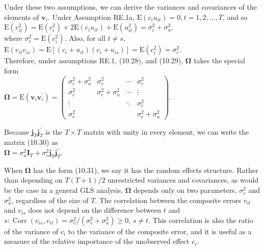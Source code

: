 \documentclass[10pt]{article}
\begin{document}
Under these two assumptions, we can derive the variances and covariances of the elements of $\mathbf{v}_{i}$. Under Assumption RE.1a, $\mathrm{E}\left(c_{i} u_{i t}\right)=0, t=1,2, \ldots, T$, and so\\
$\mathrm{E}\left(v_{i t}^{2}\right)=\mathrm{E}\left(c_{i}^{2}\right)+2 \mathrm{E}\left(c_{i} u_{i t}\right)+\mathrm{E}\left(u_{i t}^{2}\right)=\sigma_{c}^{2}+\sigma_{u}^{2}$,\\
where $\sigma_{c}^{2}=\mathrm{E}\left(c_{i}^{2}\right)$. Also, for all $t \neq s$,\\
$\mathrm{E}\left(v_{i t} v_{i s}\right)=\mathrm{E}\left[\left(c_{i}+u_{i t}\right)\left(c_{i}+u_{i s}\right)\right]=\mathrm{E}\left(c_{i}^{2}\right)=\sigma_{c}^{2}$.\\
Therefore, under assumptions RE.1, (10.28), and (10.29), $\boldsymbol{\Omega}$ takes the special form\\
$\boldsymbol{\Omega}=\mathrm{E}\left(\mathbf{v}_{i} \mathbf{v}_{i}^{\prime}\right)=\left(\begin{array}{cccc}\sigma_{c}^{2}+\sigma_{u}^{2} & \sigma_{c}^{2} & \cdots & \sigma_{c}^{2} \\ \sigma_{c}^{2} & \sigma_{c}^{2}+\sigma_{u}^{2} & \cdots & \vdots \\ \vdots & & \ddots & \sigma_{c}^{2} \\ \sigma_{c}^{2} & & & \sigma_{c}^{2}+\sigma_{u}^{2}\end{array}\right)$.

Because $\mathbf{j}_{T} \mathbf{j}_{T}^{\prime}$ is the $T \times T$ matrix with unity in every element, we can write the matrix (10.30) as\\
$\boldsymbol{\Omega}=\sigma_{u}^{2} \mathbf{I}_{T}+\sigma_{c}^{2} \mathbf{j}_{T} \mathbf{j}_{T}^{\prime}$.

When $\boldsymbol{\Omega}$ has the form (10.31), we say it has the random effects structure. Rather than depending on $T(T+1) / 2$ unrestricted variances and covariances, as would be the case in a general GLS analysis, $\boldsymbol{\Omega}$ depends only on two parameters, $\sigma_{c}^{2}$ and $\sigma_{u}^{2}$, regardless of the size of $T$. The correlation between the composite errors $v_{i t}$ and $v_{i s}$ does not depend on the difference between $t$ and $s: \operatorname{Corr}\left(v_{i s}, v_{i t}\right)=\sigma_{c}^{2} /\left(\sigma_{c}^{2}+\sigma_{u}^{2}\right) \geq 0$, $s \neq t$. This correlation is also the ratio of the variance of $c_{i}$ to the variance of the composite error, and it is useful as a measure of the relative importance of the unobserved effect $c_{i}$.
\end{document}
